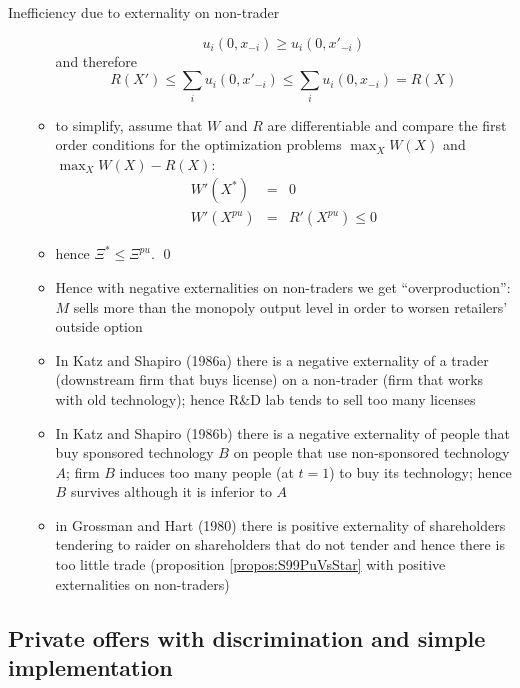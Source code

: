 \documentclass[11pt,english]{beamer}
\begin{document}
\begin{frame}[allowframebreaks]{Inefficiency due to externality on non-trader}
\begin{itemize}
\begin{itemize}
\begin{equation*}
        u_i(0,x_{-i}) \geq u_i(0,x'_{-i})
      \end{equation*}
      and therefore
      \begin{equation*}
        R(X') \leq \sum_i u_i(0,x'_{-i}) \leq \sum_i u_i(0,x_{-i}) = R(X)
      \end{equation*}
    \item to simplify, assume that $W$ and $R$ are differentiable and
      compare the first order conditions for the optimization problems
      $\max_X W(X)$ and $\max_X W(X)-R(X)$:
      \begin{eqnarray*}
        W'(X^*) &=& 0 \\
        W'(X^{pu}) &=& R'(X^{pu}) \leq 0
      \end{eqnarray*}
    \item hence $\Xi^* \leq \Xi^{pu}$. \qed
    \item Hence with negative externalities on non-traders we get
      ``overproduction'': $M$ sells more than the monopoly output
      level in order to worsen retailers' outside option
    \item In Katz and Shapiro (1986a) there is a negative externality
      of a trader (downstream firm that buys license) on a non-trader
      (firm that works with old technology); hence R\&D lab tends to
      sell too many licenses
    \item In Katz and Shapiro (1986b) there is a negative externality
      of people that buy sponsored technology $B$ on people that use
      non-sponsored technology $A$; firm $B$ induces too many people (at
      $t=1$) to buy its technology; hence $B$ survives although it is
      inferior to $A$
    \item in Grossman and Hart (1980) there is positive externality of
      shareholders tendering to raider on shareholders that do not
      tender and hence there is too little trade (proposition
      \ref{propos:S99PuVsStar} with positive externalities on non-traders)
    \end{itemize}
  \end{itemize}
\end{frame}

\subsection{Private offers with discrimination and simple implementation}
\end{document}
